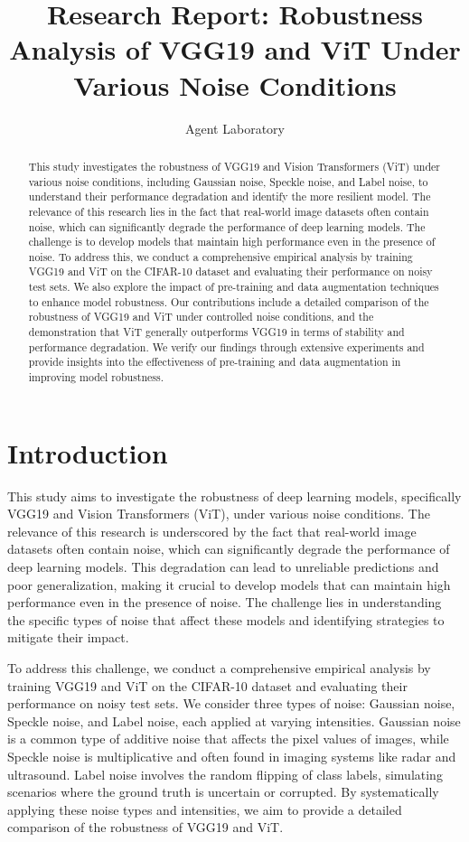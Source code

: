 \documentclass{article}
\title{Research Report: Robustness Analysis of VGG19 and ViT Under Various Noise Conditions}
\author{Agent Laboratory}
\date{}
\begin{document}
\maketitle

\begin{abstract}
This study investigates the robustness of VGG19 and Vision Transformers (ViT) under various noise conditions, including Gaussian noise, Speckle noise, and Label noise, to understand their performance degradation and identify the more resilient model. The relevance of this research lies in the fact that real-world image datasets often contain noise, which can significantly degrade the performance of deep learning models. The challenge is to develop models that maintain high performance even in the presence of noise. To address this, we conduct a comprehensive empirical analysis by training VGG19 and ViT on the CIFAR-10 dataset and evaluating their performance on noisy test sets. We also explore the impact of pre-training and data augmentation techniques to enhance model robustness. Our contributions include a detailed comparison of the robustness of VGG19 and ViT under controlled noise conditions, and the demonstration that ViT generally outperforms VGG19 in terms of stability and performance degradation. We verify our findings through extensive experiments and provide insights into the effectiveness of pre-training and data augmentation in improving model robustness.
\end{abstract}

\section{Introduction}
This study aims to investigate the robustness of deep learning models, specifically VGG19 and Vision Transformers (ViT), under various noise conditions. The relevance of this research is underscored by the fact that real-world image datasets often contain noise, which can significantly degrade the performance of deep learning models. This degradation can lead to unreliable predictions and poor generalization, making it crucial to develop models that can maintain high performance even in the presence of noise. The challenge lies in understanding the specific types of noise that affect these models and identifying strategies to mitigate their impact.

To address this challenge, we conduct a comprehensive empirical analysis by training VGG19 and ViT on the CIFAR-10 dataset and evaluating their performance on noisy test sets. We consider three types of noise: Gaussian noise, Speckle noise, and Label noise, each applied at varying intensities. Gaussian noise is a common type of additive noise that affects the pixel values of images, while Speckle noise is multiplicative and often found in imaging systems like radar and ultrasound. Label noise involves the random flipping of class labels, simulating scenarios where the ground truth is uncertain or corrupted. By systematically applying these noise types and intensities, we aim to provide a detailed comparison of the robustness of VGG19 and ViT.
\end{document}
